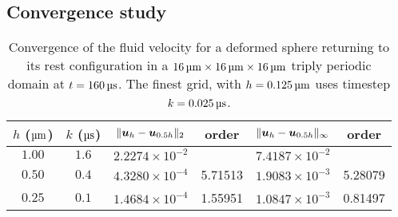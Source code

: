 \subsection{Convergence study}

\begin{table*}[ht]
    \begin{center}
        \begingroup
        \setlength{\tabcolsep}{9pt}
        \renewcommand{\arraystretch}{1.5}
        \begin{tabular}{cc|cc|cc}
                                                                                                                    \\ \toprule
            $h$ ($\um$) & $k$ ($\us$) & $\|\boldsymbol{u}_h-\boldsymbol{u}_{0.5h}\|_2$ & order   & $\|\boldsymbol{u}_h-\boldsymbol{u}_{0.5h}\|_{\infty}$ & order    \\ \midrule
            $1.00$      & $1.6$       & $2.2274\times10^{-2}$  &         & $7.4187\times10^{-2}$         &          \\
            $0.50$      & $0.4$       & $4.3280\times10^{-4}$  & 5.71513 & $1.9083\times10^{-3}$         & 5.28079  \\
            $0.25$      & $0.1$       & $1.4684\times10^{-4}$  & 1.55951 & $1.0847\times10^{-3}$         & 0.81497  \\ \bottomrule
        \end{tabular}
        \endgroup
    \end{center}
    \caption{%
Convergence of the fluid velocity for a deformed sphere returning to its rest
configuration in a $16\um\times16\um\times16\um$ triply periodic domain at
$t=160\us$. The finest grid, with $h=0.125\um$ uses timestep $k=0.025\us$.
    }
    \label{tab:u-convergence}
\end{table*}

